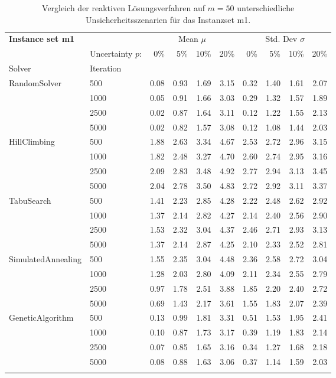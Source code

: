 {\footnotesize
\begin{longtable}{ll|rrrr|rrrr}
\toprule
\textbf{Instance set m1}                 & {} & \multicolumn{4}{c|}{Mean $\mu$} & \multicolumn{4}{c}{Std. Dev $\sigma$} \\
                & Uncertainty $p$: & 0\% & 5\% & 10\% & 20\% & 0\% & 5\% & 10\% & 20\% \\
Solver & Iteration &      &      &      &      &      &      &      &      \\
\midrule
RandomSolver & 500  & 0.08 & 0.93 & 1.69 & 3.15 & 0.32 & 1.40 & 1.61 & 2.07 \\
                 & 1000 & 0.05 & 0.91 & 1.66 & 3.03 & 0.29 & 1.32 & 1.57 & 1.89 \\
                 & 2500 & 0.02 & 0.87 & 1.64 & 3.11 & 0.12 & 1.22 & 1.55 & 2.13 \\
                 & 5000 & 0.02 & 0.82 & 1.57 & 3.08 & 0.12 & 1.08 & 1.44 & 2.03 \\ \hline
HillClimbing & 500  & 1.88 & 2.63 & 3.34 & 4.67 & 2.53 & 2.72 & 2.96 & 3.15 \\
                 & 1000 & 1.82 & 2.48 & 3.27 & 4.70 & 2.60 & 2.74 & 2.95 & 3.16 \\
                 & 2500 & 2.09 & 2.83 & 3.48 & 4.92 & 2.77 & 2.94 & 3.13 & 3.45 \\
                 & 5000 & 2.04 & 2.78 & 3.50 & 4.83 & 2.72 & 2.92 & 3.11 & 3.37 \\ \hline
TabuSearch & 500  & 1.41 & 2.23 & 2.85 & 4.28 & 2.22 & 2.48 & 2.62 & 2.92 \\
                 & 1000 & 1.37 & 2.14 & 2.82 & 4.27 & 2.14 & 2.40 & 2.56 & 2.90 \\
                 & 2500 & 1.53 & 2.32 & 3.04 & 4.37 & 2.46 & 2.71 & 2.93 & 3.13 \\
                 & 5000 & 1.37 & 2.14 & 2.87 & 4.25 & 2.10 & 2.33 & 2.52 & 2.81 \\ \hline
SimulatedAnnealing & 500  & 1.55 & 2.35 & 3.04 & 4.48 & 2.36 & 2.58 & 2.72 & 3.04 \\
                 & 1000 & 1.28 & 2.03 & 2.80 & 4.09 & 2.11 & 2.34 & 2.55 & 2.79 \\
                 & 2500 & 0.97 & 1.78 & 2.51 & 3.88 & 1.85 & 2.20 & 2.40 & 2.72 \\
                 & 5000 & 0.69 & 1.43 & 2.17 & 3.61 & 1.55 & 1.83 & 2.07 & 2.39 \\ \hline
GeneticAlgorithm & 500  & 0.13 & 0.99 & 1.81 & 3.31 & 0.51 & 1.53 & 1.95 & 2.41 \\
                 & 1000 & 0.10 & 0.87 & 1.73 & 3.17 & 0.39 & 1.19 & 1.83 & 2.14 \\
                 & 2500 & 0.07 & 0.85 & 1.65 & 3.16 & 0.34 & 1.27 & 1.68 & 2.18 \\
                 & 5000 & 0.08 & 0.88 & 1.63 & 3.06 & 0.37 & 1.14 & 1.59 & 2.03 \\
\bottomrule
\caption{Vergleich der reaktiven Lösungsverfahren auf $m=50$ unterschiedliche Unsicherheitsszenarien für das Instanzset m1. }
\label{tab:evaluation_reactive_m1}
\end{longtable}
}

